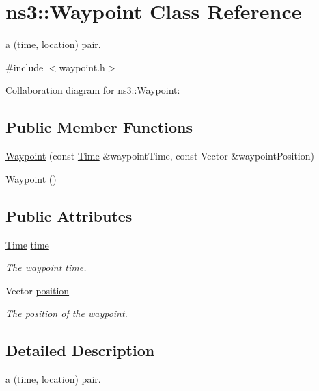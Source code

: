 \hypertarget{classns3_1_1Waypoint}{}\section{ns3\+:\+:Waypoint Class Reference}
\label{classns3_1_1Waypoint}


a (time, location) pair.  




{\ttfamily \#include $<$waypoint.\+h$>$}



Collaboration diagram for ns3\+:\+:Waypoint\+:
\subsection*{Public Member Functions}
\begin{DoxyCompactItemize}
\item 
\hyperlink{classns3_1_1Waypoint_a30924bcae8b15e1e9b4939e4493de4f1}{Waypoint} (const \hyperlink{classns3_1_1Time}{Time} \&waypoint\+Time, const Vector \&waypoint\+Position)
\item 
\hyperlink{classns3_1_1Waypoint_a27c6c39a739a992e8b9ba3b79f322cac}{Waypoint} ()
\end{DoxyCompactItemize}
\subsection*{Public Attributes}
\begin{DoxyCompactItemize}
\item 
\hyperlink{classns3_1_1Time}{Time} \hyperlink{classns3_1_1Waypoint_a41abef75280fb29826363ea4348675eb}{time}
\begin{DoxyCompactList}\small\item\em The waypoint time. \end{DoxyCompactList}\item 
Vector \hyperlink{classns3_1_1Waypoint_aad44d9729765083f4d100dc357b96fcd}{position}
\begin{DoxyCompactList}\small\item\em The position of the waypoint. \end{DoxyCompactList}\end{DoxyCompactItemize}


\subsection{Detailed Description}
a (time, location) pair. 

